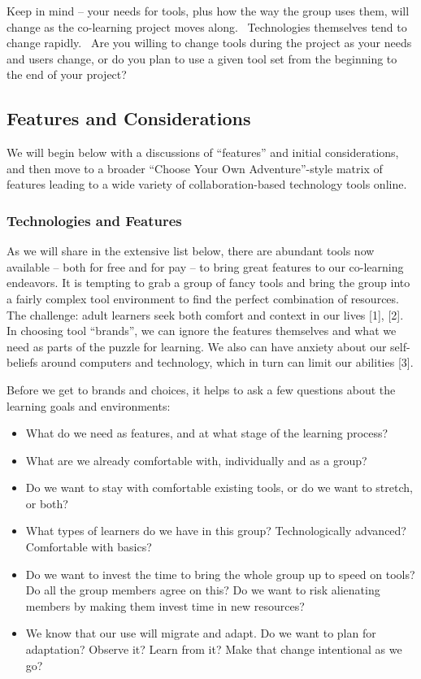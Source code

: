 Keep in mind -- your needs for tools, plus how the way the group uses
them, will change as the co-learning project moves along.~ Technologies
themselves tend to change rapidly.~ Are you willing to change tools
during the project as your needs and users change, or do you plan to use
a given tool set from the beginning to the end of your project?

\subsection{Features and
Considerations}\label{features-and-considerations}

We will begin below with a discussions of ``features'' and initial
considerations, and then move to a broader ``Choose Your Own
Adventure''-style matrix of features leading to a wide variety of
collaboration-based technology tools online.

\subsubsection{Technologies and
Features}\label{technologies-and-features}

As we will share in the extensive list below, there are abundant tools
now available -- both for free and for pay -- to bring great features to
our co-learning endeavors. It is tempting to grab a group of fancy tools
and bring the group into a fairly complex tool environment to find the
perfect combination of resources. The challenge: adult learners seek
both comfort and context in our lives {{[}1{]}}, {{[}2{]}}. In choosing
tool ``brands'', we can ignore the features themselves and what we need
as parts of the puzzle for learning. We also can have anxiety about our
self-beliefs around computers and technology, which in turn can limit
our abilities {{[}3{]}}.

Before we get to brands and choices, it helps to ask a few questions
about the learning goals and environments:

\begin{itemize}
\itemsep1pt\parskip0pt
\item
  What do we need as features, and at what stage of the learning
  process?
\item
  What are we already comfortable with, individually and as a group?
\item
  Do we want to stay with comfortable existing tools, or do we want to
  stretch, or both?
\item
  What types of learners do we have in this group? Technologically
  advanced? Comfortable with basics?
\item
  Do we want to invest the time to bring the whole group up to speed on
  tools? Do all the group members agree on this? Do we want to risk
  alienating members by making them invest time in new resources?
\item
  We know that our use will migrate and adapt. Do we want to plan for
  adaptation? Observe it? Learn from it? Make that change intentional as
  we go?
\end{itemize}


